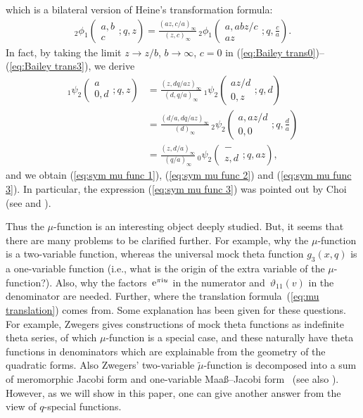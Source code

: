 \documentclass[pdftex]{sigma}
\numberwithin{equation}{section}
\theoremstyle{definition}
\begin{document}
which is a bilateral version of Heine's transformation formula:
\begin{gather*}
{_{2}\phi _1}\left(\begin{matrix}a,b \\ c \end{matrix};q,z\right)
 =
 \frac{(az,c/a)_{\infty}}{(z,c)_{\infty}}\,
 {_{2}\phi _1}\left(\begin{matrix}a,abz/c \\ az \end{matrix};q,\frac{c}{a}\right).
\end{gather*}
In fact, by taking the limit $z \rightarrow z/b$, $b\rightarrow \infty$, $c=0$ in (\ref{eq:Bailey trans0})--(\ref{eq:Bailey trans3}), we derive
\begin{align}
\label{eq:Bailey trans special1}
{}_1\psi_2\left(\begin{matrix}a\\0,d\end{matrix};q,z\right)
 &=
 \frac{(z,dq/az)_\infty}{(d,q/a)_\infty}\,{}_1\psi_2\left(\begin{matrix}az/d\\0,z\end{matrix};q,d\right) \\
\label{eq:Bailey trans special2}
 &=
 \frac{(d/a,dq/az)_\infty}{(d)_\infty}\,{}_2\psi_2\left(\begin{matrix}a,az/d\\0,0\end{matrix};q,\frac{d}{a}\right) \\
\label{eq:Bailey trans special3}
 &=
 \frac{(z,d/a)_{\infty}}{(q/a)_{\infty}}\,{}_0\psi_2\left(\begin{matrix}- \\z,d\end{matrix};q,az\right),
\end{align}
and we obtain (\ref{eq:sym mu func 1}), (\ref{eq:sym mu func 2}) and (\ref{eq:sym mu func 3}).
In particular, the expression (\ref{eq:sym mu func 3}) was pointed out by Choi (see \cite[Theorem 4]{C} and \cite[Theorem 5.1]{B}).


Thus the $\mu$-function is an interesting object deeply studied.
But, it seems that there are many problems to be clarified further.
For example, why the $\mu$-function is a two-variable function, whereas the universal mock theta function $g_{3}(x,q)$ is a one-variable function (i.e., what is the origin of the extra variable of the $\mu$-function?).
Also, why the factors~${\rm e}^{\pi{\rm i}u}$ in the numerator and~$\vartheta_{11}(v)$ in the denominator are needed.
Further, where the translation formula~(\ref{eq:mu translation}) comes from.
Some explanation has been given for these questions.
For example, Zwegers gives constructions of mock theta functions as indefinite theta series, of which $\mu$-function is a special case, and these naturally have theta functions in denominators which are explainable from the geometry of the quadratic forms. Also Zwegers' two-variable $\tilde{\mu}$-function is decomposed into a sum of meromorphic Jacobi form and one-variable Maa\ss--Jacobi form~\cite{R} (see also \cite[Theorem~8.18]{BFOR}).
However, as we will show in this paper, one can give another answer from the view of $q$-special functions.
\end{document}
